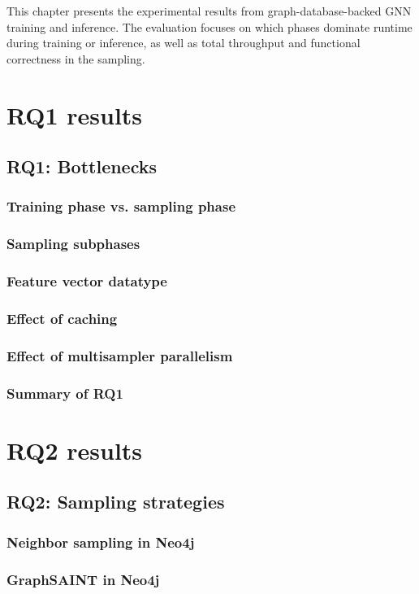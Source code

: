 \documentclass[PhD]{uclathes}
\begin{document}
This chapter presents the experimental results from graph-database-backed GNN
training and inference. The evaluation focuses on which phases dominate runtime
during training or inference, as well as total throughput and functional
correctness in the sampling.

\section{RQ1 results}
\subsection{RQ1: Bottlenecks}
\subsubsection{Training phase vs. sampling phase}
\subsubsection{Sampling subphases}
\subsubsection{Feature vector datatype}
\subsubsection{Effect of caching}
\subsubsection{Effect of multisampler parallelism}
\subsubsection{Summary of RQ1}

\section{RQ2 results}
\subsection{RQ2: Sampling strategies}
\subsubsection{Neighbor sampling in Neo4j}
\subsubsection{GraphSAINT in Neo4j}
\end{document}

